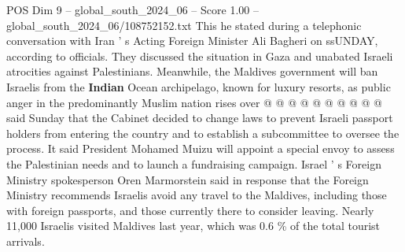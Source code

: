 \begin{textsample}{POS Dim 9 – global\_south\_2024\_06 – Score 1.00 – global\_south\_2024\_06/108752152.txt}
This he stated during a telephonic conversation with Iran ' s Acting Foreign Minister Ali Bagheri on ssUNDAY, according to officials.
They discussed the situation in Gaza and unabated Israeli atrocities against Palestinians.
Meanwhile, the Maldives government will ban Israelis from the \textbf{Indian} Ocean archipelago, known for luxury resorts, as public anger in the predominantly Muslim nation rises over @ @ @ @ @ @ @ @ @ @ said Sunday that the Cabinet decided to change laws to prevent Israeli passport holders from entering the country and to establish a subcommittee to oversee the process.
It said President Mohamed Muizu will appoint a special envoy to assess the Palestinian needs and to launch a fundraising campaign.
Israel ' s Foreign Ministry spokesperson Oren Marmorstein said in response that the Foreign Ministry recommends Israelis avoid any travel to the Maldives, including those with foreign passports, and those currently there to consider leaving.
Nearly 11,000 Israelis visited Maldives last year, which was 0.6 \% of the total tourist arrivals.

\end{textsample}
